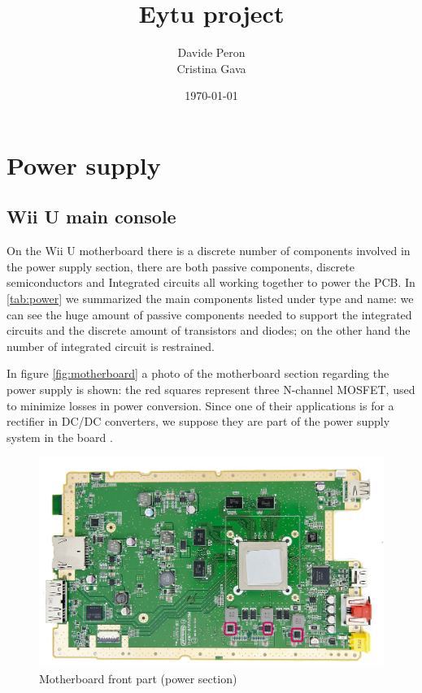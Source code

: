 \documentclass[11pt,a4paper,titlepage]{article}
\title{\blue Eytu project}
\author{Davide Peron\\ Cristina Gava}
\date{\today}
\begin{document}
\maketitle

\tableofcontents
\clearpage

\section{Power supply}
  \subsection{Wii U main console}
      On the Wii U motherboard there is a discrete number of components involved in the power supply section, there are both passive components, discrete semiconductors and Integrated circuits all working together to power the PCB. In \autoref{tab:power} we summarized the main components listed under type and name: we can see the huge amount of passive components needed to support the integrated circuits and the discrete amount of transistors and      diodes; on the other hand the number of integrated circuit is restrained.

      In figure \autoref{fig:motherboard} a photo of the motherboard section regarding the power supply is shown: the red squares represent three N-channel MOSFET, used to minimize losses in power conversion. Since one of their applications is for a rectifier in DC/DC converters, we suppose they are part of the power supply system in the board \cite{mosfet8026}.

      \begin{figure}
        \centering
        \includegraphics[width = .85\textwidth]{motherboard_front.png}
        \caption{Motherboard front part (power section)}
        \label{fig:motherboard}
      \end{figure}
\end{document}

